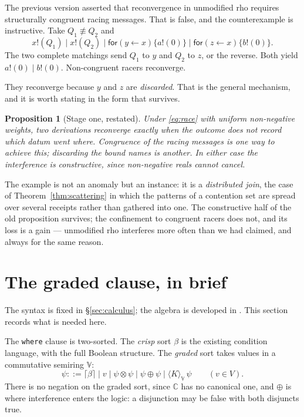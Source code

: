 \documentclass[11pt,a4paper]{article}
\theoremstyle{plain}
\newtheorem{proposition}[theorem]{Proposition}
\theoremstyle{definition}
\theoremstyle{remark}
\newcommand{\V}{\mathbb{V}}
\newcommand{\Cx}{\mathbb{C}}
\newcommand{\scong}{\equiv}
\newcommand{\tensorv}{\otimes}
\newcommand{\sumv}{\oplus}
\newcommand{\crisp}[1]{\lceil #1 \rceil}
\begin{document}
The previous version asserted that reconvergence in unmodified rho requires
structurally congruent racing messages. That is false, and the counterexample is
instructive. Take $Q_1 \not\scong Q_2$ and
\[
  x!(Q_1) \mid x!(Q_2)
  \mid \textsf{for}(y \leftarrow x)\{a!(0)\}
  \mid \textsf{for}(z \leftarrow x)\{b!(0)\} .
\]
The two complete matchings send $Q_1$ to $y$ and $Q_2$ to $z$, or the reverse.
Both yield $a!(0) \mid b!(0)$. Non-congruent racers reconverge.

They reconverge because $y$ and $z$ are \emph{discarded}. That is the general
mechanism, and it is worth stating in the form that survives.

\begin{proposition}[Stage one, restated]\label{prop:stage1}
Under \eqref{eq:race} with uniform non-negative weights, two derivations
reconverge exactly when the outcome does not record which datum went where.
Congruence of the racing messages is one way to achieve this; discarding the
bound names is another. In either case the interference is constructive, since
non-negative reals cannot cancel.
\end{proposition}

The example is not an anomaly but an instance: it is a \emph{distributed join},
the case of Theorem~\ref{thm:scattering} in which the patterns of a contention
set are spread over several receipts rather than gathered into one. The
constructive half of the old proposition survives; the confinement to congruent
racers does not, and its loss is a gain --- unmodified rho interferes more often
than we had claimed, and always for the same reason.

\section{The graded clause, in brief}\label{sec:design}

The syntax is fixed in \S\ref{sec:calculus}; the algebra is developed in
\cite{ResAlg}. This section records what is needed here.

The \texttt{where} clause is two-sorted. The \emph{crisp} sort $\beta$ is the
existing condition language, with the full Boolean structure. The \emph{graded}
sort takes values in a commutative semiring $\V$:
\[
  \psi ::= \crisp{\beta} \mid v \mid \psi \tensorv \psi \mid \psi \sumv \psi
  \mid \langle K \rangle_{\V}\,\psi \qquad (v \in V).
\]
There is no negation on the graded sort, since $\Cx$ has no canonical one, and
$\sumv$ is where interference enters the logic: a disjunction may be false with
both disjuncts true.
\end{document}
